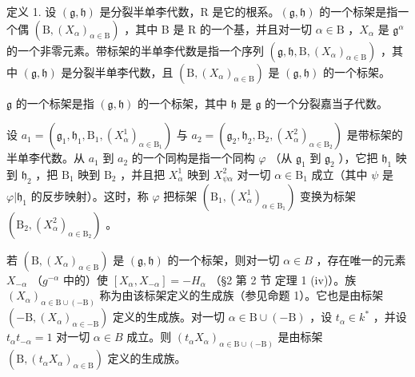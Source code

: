 定义 1. 设 \((\mathfrak{g},\mathfrak{h})\) 是分裂半单李代数，R 是它的根系。\((\mathfrak{g},\mathfrak{h})\) 的一个标架是指一个偶 \((\mathrm{B},(X_{\alpha})_{\alpha \in \mathrm{B}})\) ，其中 B 是 R 的一个基，并且对一切 \(\alpha \in \mathrm{B}\) ，\(X_{\alpha}\) 是 \(\mathfrak{g}^{\alpha}\) 的一个非零元素。带标架的半单李代数是指一个序列 \((\mathfrak{g},\mathfrak{h},\mathrm{B},(X_{\alpha})_{\alpha \in \mathrm{B}})\) ，其中 \((\mathfrak{g},\mathfrak{h})\) 是分裂半单李代数，且 \((\mathrm{B},(X_{\alpha})_{\alpha \in \mathrm{B}})\) 是 \((\mathfrak{g},\mathfrak{h})\) 的一个标架。

\(\mathfrak{g}\) 的一个标架是指 \((\mathfrak{g},\mathfrak{h})\) 的一个标架，其中 \(\mathfrak{h}\) 是 \(\mathfrak{g}\) 的一个分裂嘉当子代数。

设 \(a_1 = (\mathfrak{g}_1, \mathfrak{h}_1, \mathrm{B}_1, (X_\alpha^1)_{\alpha \in \mathrm{B}_1})\) 与 \(a_2 = (\mathfrak{g}_2, \mathfrak{h}_2, \mathrm{B}_2, (X_\alpha^2)_{\alpha \in \mathrm{B}_2})\) 是带标架的半单李代数。从 \(a_1\) 到 \(a_2\) 的一个同构是指一个同构 \(\varphi\) （从 \(\mathfrak{g}_1\) 到 \(\mathfrak{g}_2\) ），它把 \(\mathfrak{h}_1\) 映到 \(\mathfrak{h}_2\) ，把 \(\mathrm{B}_1\) 映到 \(\mathrm{B}_2\) ，并且把 \(X_\alpha^1\) 映到 \(X_{\psi \alpha}^2\) 对一切 \(\alpha \in \mathrm{B}_1\) 成立（其中 \(\psi\) 是 \(\varphi | \mathfrak{h}_1\) 的反步映射）。这时，称 \(\varphi\) 把标架 \((\mathrm{B}_1, (X_\alpha^1)_{\alpha \in \mathrm{B}_1})\) 变换为标架 \((\mathrm{B}_2, (X_\alpha^2)_{\alpha \in \mathrm{B}_2})\) 。

若 \((\mathrm{B},(X_{\alpha})_{\alpha\in\mathrm{B}})\) 是 \((\mathfrak{g},\mathfrak{h})\) 的一个标架，则对一切 \(\alpha\in B\) ，存在唯一的元素 \(X_{-\alpha}\) （\(g^{-\alpha}\) 中的）使 \([X_{\alpha},X_{-\alpha}]=-H_{\alpha}\) （§2 第 2 节 定理 1 (iv)）。族 \((X_{\alpha})_{\alpha\in\mathrm{B}\cup(-\mathrm{B})}\) 称为由该标架定义的生成族（参见命题 1）。它也是由标架 \((-\mathrm{B},(X_{\alpha})_{\alpha\in-\mathrm{B}})\) 定义的生成族。对一切 \(\alpha\in\mathrm{B}\cup(-\mathrm{B})\) ，设 \(t_{\alpha}\in k^{*}\) ，并设 \(t_{\alpha}t_{-\alpha}=1\) 对一切 \(\alpha\in B\) 成立。则 \((t_{\alpha}X_{\alpha})_{\alpha\in\mathrm{B}\cup(-\mathrm{B})}\) 是由标架 \((\mathrm{B},(t_{\alpha}X_{\alpha})_{\alpha\in\mathrm{B}})\) 定义的生成族。

